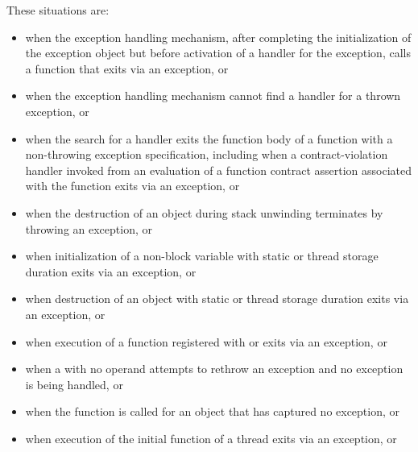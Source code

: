 \begin{note}
These situations are:
%
\begin{itemize}
\item%
when the exception handling mechanism, after completing
the initialization of the exception object
but before
activation of a handler for the exception,
calls a function that exits
via an exception, or

\item%
when the exception handling mechanism cannot find a handler for a thrown exception, or

\item when the search for a handler
exits the function body of a function
with a non-throwing exception specification,
including when a contract-violation handler
invoked from an evaluation of
a function contract assertion associated with the function
exits via an exception,
or

\item%
when the destruction of an object during stack unwinding
terminates by throwing an exception, or

\item%
when initialization of a non-block
variable with static or thread storage duration
exits via an exception, or

\item%
when destruction of an object with static or thread storage duration exits
via an exception, or

\item%
when execution of a function registered with
 or 
exits via an exception, or

\item%
when a
with no operand attempts to rethrow an exception and no exception is being
handled, or

\item%
when the function  is called for an object
that has captured no exception, or

\item%
when execution of the initial function of a thread exits via
an exception, or


\end{itemize}
\end{note}
